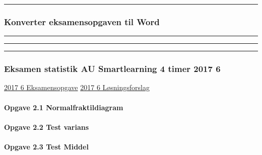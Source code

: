 \documentclass[]{book}
\let\oldparagraph\paragraph
\renewcommand{\paragraph}[1]{\oldparagraph{#1}\mbox{}}
\begin{document}
\begin{center}\rule{0.5\linewidth}{\linethickness}\end{center}

\hypertarget{konverter-eksamensopgaven-til-word}{%
\subsubsection{Konverter eksamensopgaven til Word}\label{konverter-eksamensopgaven-til-word}}

\begin{center}\rule{0.5\linewidth}{\linethickness}\end{center}

\begin{center}\rule{0.5\linewidth}{\linethickness}\end{center}

\begin{center}\rule{0.5\linewidth}{\linethickness}\end{center}

\hypertarget{eksamen-statistik-au-smartlearning-4-timer-2017-6}{%
\subsubsection{Eksamen statistik AU Smartlearning 4 timer 2017 6}\label{eksamen-statistik-au-smartlearning-4-timer-2017-6}}

\href{https://www.dropbox.com/s/dlgt1hnh6wu4aja/Statistik\%20eksamensopgave\%20juni\%202017\%20opgave\%202.pdf?dl=1}{2017 6 Eksamensopgave}
\href{https://www.dropbox.com/s/s0fl0lg2i2zk2hh/Eksamen\%202017\%20juni\%20opgave\%202\%20L\%C3\%98SNING.docx?dl=1}{2017 6 Løsningsforslag}

\hypertarget{opgave-2.1-normalfraktildiagram}{%
\paragraph{Opgave 2.1 Normalfraktildiagram}\label{opgave-2.1-normalfraktildiagram}}

\hypertarget{opgave-2.2-test-varians}{%
\paragraph{Opgave 2.2 Test varians}\label{opgave-2.2-test-varians}}

\hypertarget{opgave-2.3-test-middel}{%
\paragraph{Opgave 2.3 Test Middel}\label{opgave-2.3-test-middel}}
\end{document}
